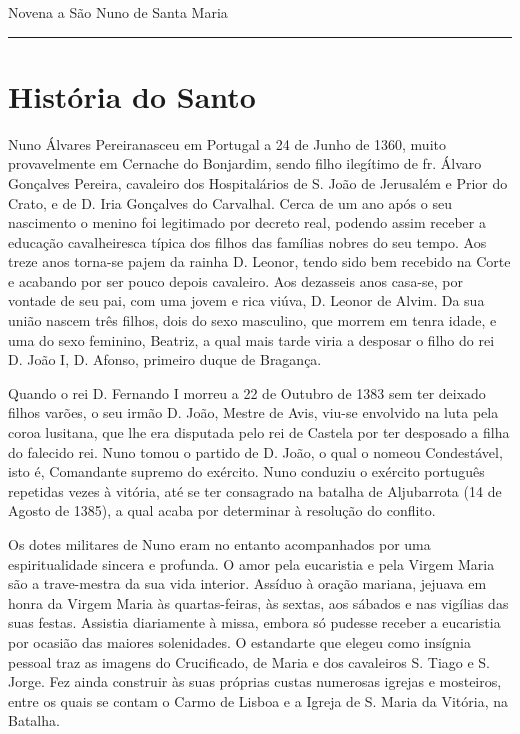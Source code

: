\documentclass[a4paper,14pt]{extarticle} \usepackage[utf8]{inputenc}
\begin{document}
\begin{center}
  {\huge Novena a São Nuno de Santa Maria}
\end{center}

\par\noindent\rule{\textwidth}{0.4pt}

\tableofcontents
\thispagestyle{empty}

\newpage

\section{História do Santo}
Nuno Álvares Pereiranasceu em Portugal a 24 de Junho de 1360, muito provavelmente em Cernache do Bonjardim, sendo filho ilegítimo de fr. Álvaro Gonçalves Pereira, cavaleiro dos Hospitalários de S. João de Jerusalém e Prior do Crato, e de D. Iria Gonçalves do Carvalhal. Cerca de um ano após o seu nascimento o menino foi legitimado por decreto real, podendo assim receber a educação cavalheiresca típica dos filhos das famílias nobres do seu tempo. Aos treze anos torna-se pajem da rainha D. Leonor, tendo sido bem recebido na Corte e acabando por ser pouco depois cavaleiro. Aos dezasseis anos casa-se, por vontade de seu pai, com uma jovem e rica viúva, D. Leonor de Alvim. Da sua união nascem três filhos, dois do sexo masculino, que morrem em tenra idade, e uma do sexo feminino, Beatriz, a qual mais tarde viria a desposar o filho do rei D. João I, D. Afonso, primeiro duque de Bragança.

Quando o rei D. Fernando I morreu a 22 de Outubro de 1383 sem ter deixado filhos varões, o seu irmão D. João, Mestre de Avis, viu-se envolvido na luta pela coroa lusitana, que lhe era disputada pelo rei de Castela por ter desposado a filha do falecido rei. Nuno tomou o partido de D. João, o qual o nomeou Condestável, isto é, Comandante supremo do exército. Nuno conduziu o exército português repetidas vezes à vitória, até se ter consagrado na batalha de Aljubarrota (14 de Agosto de 1385), a qual acaba por determinar à resolução do conflito.

Os dotes militares de Nuno eram no entanto acompanhados por uma espiritualidade sincera e profunda. O amor pela eucaristia e pela Virgem Maria são a trave-mestra da sua vida interior. Assíduo à oração mariana, jejuava em honra da Virgem Maria às quartas-feiras, às sextas, aos sábados e nas vigílias das suas festas. Assistia diariamente à missa, embora só pudesse receber a eucaristia por ocasião das maiores solenidades. O estandarte que elegeu como insígnia pessoal traz as imagens do Crucificado, de Maria e dos cavaleiros S. Tiago e S. Jorge. Fez ainda construir às suas próprias custas numerosas igrejas e mosteiros, entre os quais se contam o Carmo de Lisboa e a Igreja de S. Maria da Vitória, na Batalha.
\end{document}
